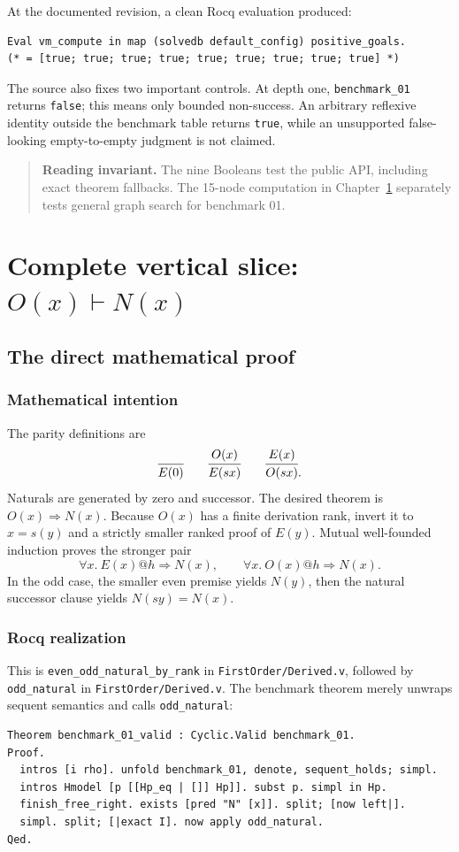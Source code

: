 \documentclass[11pt,oneside]{book}
\DeclareRobustCommand{\code}[1]{\nolinkurl{#1}}
\DeclareRobustCommand{\file}[1]{\nolinkurl{#1}}
\newcommand{\src}[2]{\code{#2} in \file{#1}}
\newcommand{\mathintent}{\subsection*{Mathematical intention}}
\newcommand{\rocqreal}{\subsection*{Rocq realization}}
\newcommand{\takeaway}[1]{\begin{quote}\small\textbf{Reading invariant.} #1\end{quote}}
\begin{document}
At the documented revision, a clean Rocq evaluation produced:
\begin{lstlisting}[caption={The nine public outcomes, reproduced with vm\_compute.}]
Eval vm_compute in map (solvedb default_config) positive_goals.
(* = [true; true; true; true; true; true; true; true; true] *)
\end{lstlisting}
The source also fixes two important controls.  At depth one,
\code{benchmark_01} returns \code{false}; this means only bounded non-success.
An arbitrary reflexive identity outside the benchmark table returns
\code{true}, while an unsupported false-looking empty-to-empty judgment is not
claimed.

\takeaway{The nine Booleans test the public API, including exact theorem
fallbacks.  The 15-node computation in Chapter~\ref{ch:vertical} separately
tests general graph search for benchmark 01.}

\chapter{Complete vertical slice: \texorpdfstring{\(O(x)\vdash N(x)\)}{O(x) entails N(x)}}
\label{ch:vertical}

\section{The direct mathematical proof}

\mathintent

The parity definitions are
\[
 \infer{E(0)}{}
 \qquad
 \infer{E(sx)}{O(x)}
 \qquad
 \infer{O(sx)}{E(x)}.
\]
Naturals are generated by zero and successor.  The desired theorem is
\(O(x)\Rightarrow N(x)\).  Because \(O(x)\) has a finite derivation rank, invert
it to \(x=s(y)\) and a strictly smaller ranked proof of \(E(y)\).  Mutual
well-founded induction proves the stronger pair
\[
 \forall x.\ E(x)@h\Rightarrow N(x),
 \qquad
 \forall x.\ O(x)@h\Rightarrow N(x).
\]
In the odd case, the smaller even premise yields \(N(y)\), then the natural
successor clause yields \(N(sy)=N(x)\).

\rocqreal

This is \src{FirstOrder/Derived.v}{even_odd_natural_by_rank}, followed by
\src{FirstOrder/Derived.v}{odd_natural}.  The benchmark theorem merely unwraps
sequent semantics and calls \code{odd_natural}:
\begin{lstlisting}[caption={The semantic endpoint used by the benchmark theorem.}]
Theorem benchmark_01_valid : Cyclic.Valid benchmark_01.
Proof.
  intros [i rho]. unfold benchmark_01, denote, sequent_holds; simpl.
  intros Hmodel [p [[Hp_eq | []] Hp]]. subst p. simpl in Hp.
  finish_free_right. exists [pred "N" [x]]. split; [now left|].
  simpl. split; [|exact I]. now apply odd_natural.
Qed.
\end{lstlisting}
\end{document}
